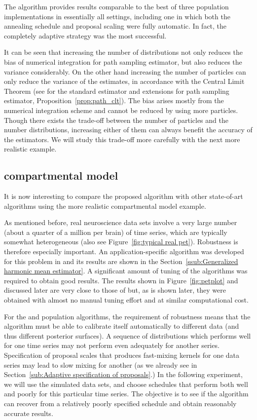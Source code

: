 The \smc algorithm provides results comparable to the best of three population \mcmc implementations in essentially all settings, including one in which both the annealing schedule and proposal scaling were fully automatic. In fact, the completely adaptive strategy was the most successful.

It can be seen that increasing the number of distributions not only reduces the bias of numerical integration for path sampling estimator, but also reduces the variance considerably. On the other hand increasing the number of particles can only reduce the variance of the estimates, in accordance with the Central Limit Theorem (see \cite{DelMoral:2006hc} for the standard estimator and extensions for path sampling estimator, Proposition~\ref{prop:path_clt}). The bias arises mostly from the numerical integration scheme and cannot be reduced by using more particles. Though there exists the trade-off between the number of particles and the number distributions, increasing either of them can always benefit the accuracy of the estimators. We will study this trade-off more carefully with the next more realistic example.

\subsection[\protect\pet compartmental model]{\protect\pet compartmental model}
\label{sub:pet compartmental model}

It is now interesting to compare the proposed algorithm with other state-of-art algorithms using the more realistic \pet compartmental model example.

As mentioned before, real neuroscience data sets involve a very large number (about a quarter of a million per brain) of time series, which are typically somewhat heterogeneous (also see Figure~\ref{fig:typical real pet}). Robustness is therefore especially important. An application-specific \mcmc algorithm was developed for this problem in \cite{Zhou2013} and its results are shown in the Section~\ref{ssub:Generalized harmonic mean estimator}. A significant amount of tuning of the algorithms was required to obtain good results. The results shown in Figure~\ref{fig:petplot} and discussed later are very close to those of \cite{Zhou2013} but, as is shown later, they were obtained with almost no manual tuning effort and at similar computational cost.

For the \smc and population \mcmc algorithms, the requirement of robustness means that the algorithm must be able to calibrate itself automatically to different data (and thus different posterior surfaces). A sequence of distributions which performs well for one time series may not perform even adequately for another series. Specification of proposal scales that produces fast-mixing kernels for one data series may lead to slow mixing for another (as we already see in Section~\ref{sub:Adaptive specification of proposals}.) In the following experiment, we will use the simulated data sets, and choose schedules that perform both well and poorly for this particular time series. The objective is to see if the algorithm can recover from a relatively poorly specified schedule and obtain reasonably accurate results.

